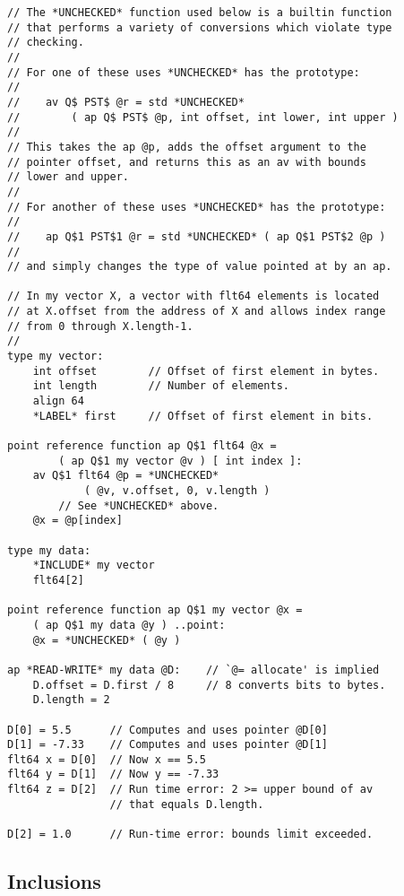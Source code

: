 \documentclass[12pt]{article}
\newenvironment{indpar}[1][0.3in]%
	{\begin{list}{}%
		     {\setlength{\itemsep}{0in}%
		      \setlength{\topsep}{0in}%
		      \setlength{\parsep}{1ex}%
		      \setlength{\labelwidth}{#1}%
		      \setlength{\leftmargin}{#1}%
		      \addtolength{\leftmargin}{\labelsep}}%
	 \item}%
	{\end{list}}
\begin{document}
\begin{indpar}\label{REFERENCE-FUNCTION-EXAMPLE}\begin{verbatim}
// The *UNCHECKED* function used below is a builtin function
// that performs a variety of conversions which violate type
// checking.
//
// For one of these uses *UNCHECKED* has the prototype:
//
//    av Q$ PST$ @r = std *UNCHECKED*
//        ( ap Q$ PST$ @p, int offset, int lower, int upper )
//
// This takes the ap @p, adds the offset argument to the
// pointer offset, and returns this as an av with bounds
// lower and upper.
//
// For another of these uses *UNCHECKED* has the prototype:
//
//    ap Q$1 PST$1 @r = std *UNCHECKED* ( ap Q$1 PST$2 @p )
//
// and simply changes the type of value pointed at by an ap.

// In my vector X, a vector with flt64 elements is located
// at X.offset from the address of X and allows index range
// from 0 through X.length-1.
//
type my vector:
    int offset        // Offset of first element in bytes.
    int length        // Number of elements.
    align 64
    *LABEL* first     // Offset of first element in bits.

point reference function ap Q$1 flt64 @x =
        ( ap Q$1 my vector @v ) [ int index ]:
    av Q$1 flt64 @p = *UNCHECKED*
            ( @v, v.offset, 0, v.length )
        // See *UNCHECKED* above.
    @x = @p[index]

type my data:
    *INCLUDE* my vector
    flt64[2]

point reference function ap Q$1 my vector @x =
    ( ap Q$1 my data @y ) ..point:
    @x = *UNCHECKED* ( @y )

ap *READ-WRITE* my data @D:    // `@= allocate' is implied
    D.offset = D.first / 8     // 8 converts bits to bytes.
    D.length = 2

D[0] = 5.5      // Computes and uses pointer @D[0]
D[1] = -7.33    // Computes and uses pointer @D[1]
flt64 x = D[0]  // Now x == 5.5
flt64 y = D[1]  // Now y == -7.33
flt64 z = D[2]  // Run time error: 2 >= upper bound of av
                // that equals D.length.

D[2] = 1.0      // Run-time error: bounds limit exceeded.
\end{verbatim}\end{indpar}


\subsection{Inclusions}
\label{INCLUSIONS}
\end{document}

